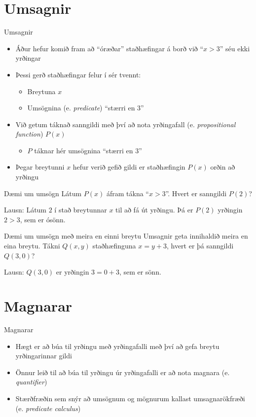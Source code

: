 \documentclass{beamer}
\begin{document}
\section{Umsagnir}

\begin{frame}{Umsagnir}
\begin{itemize}
 \item Áður hefur komið fram að ``óræðar'' staðhæfingar á borð við ``$x > 3$'' séu ekki yrðingar
 \item Þessi gerð staðhæfingar felur í sér tvennt:
 \begin{itemize}
  \item Breytuna $x$
  \item Umsögnina (e. \emph{predicate}) ``stærri en 3''
 \end{itemize}
 \item Við getum táknað sanngildi með því að nota yrðingafall (e. \emph{propositional function}) $P(x)$
 \begin{itemize}
  \item $P$ táknar hér umsögnina ``stærri en 3''
 \end{itemize}
 \item Þegar breytunni $x$ hefur verið gefið gildi er staðhæfingin $P(x)$ orðin að yrðingu
\end{itemize}
\end{frame}

\begin{frame}{Dæmi um umsögn}
Látum $P(x)$ áfram tákna ``$x > 3$''. Hvert er sanngildi $P(2)$? \pause

\vspace{0.5cm}
Lausn: Látum $2$ í stað breytunnar $x$ til að fá út yrðingu. Þá er $P(2)$ yrðingin $2 > 3$, sem er ósönn.
\end{frame}

\begin{frame}{Dæmi um umsögn með meira en einni breytu}
Umsagnir geta innihaldið meira en eina breytu. Tákni $Q(x, y)$ staðhæfinguna $x = y + 3$, hvert er þá sanngildi $Q(3, 0)$? \pause
\vspace{0.5cm}

Lausn: $Q(3, 0)$ er yrðingin $3 = 0 + 3$, sem er sönn.
\end{frame}

\section{Magnarar}

\begin{frame}{Magnarar}
\begin{itemize}
 \item Hægt er að búa til yrðingu með yrðingafalli með því að gefa breytu yrðingarinnar gildi
 \item Önnur leið til að búa til yrðingu úr yrðingafalli er að nota magnara (e. \emph{quantifier})
 \item Stærðfræðin sem snýr að umsögnum og mögnurum kallast umsagnarökfræði (e. \emph{predicate calculus})
\end{itemize}
\end{frame}
\end{document}

